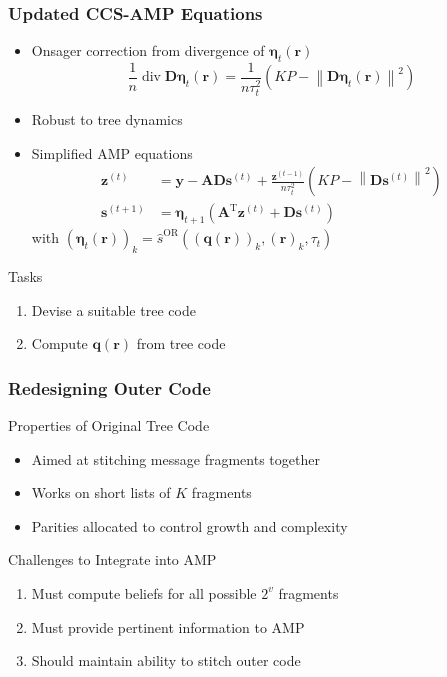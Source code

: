 \documentclass[10pt]{beamer}
\begin{document}
\begin{frame}
\frametitle{Updated CCS-AMP Equations}
\begin{itemize}
\item Onsager correction from divergence of $\boldsymbol{\eta}_t (\mathbf{r})$
\begin{equation*}
\frac{1}{n} \operatorname{div} \mathbf{D} \boldsymbol{\eta}_t \left( \mathbf{r} \right)
= \frac{1}{n \tau_t^2} \left( K P - \left\| \mathbf{D} \boldsymbol{\eta}_t \left( \mathbf{r} \right) \right\|^2 \right)
\end{equation*}
\item Robust to tree dynamics
\item Simplified AMP equations
\begin{align*}
\mathbf{z}^{(t)} &= \mathbf{y} - \mathbf{A} \mathbf{D} \mathbf{s}^{(t)} + \frac{\mathbf{z}^{(t-1)}}{n \tau_t^2} \left( K P - \left\| \mathbf{D} \mathbf{s}^{(t)} \right\|^2 \right) \\
\mathbf{s}^{(t+1)} &= \boldsymbol{\eta}_{t+1} \left( \mathbf{A}^{\mathrm{T}} \mathbf{z}^{(t)} + \mathbf{D} \mathbf{s}^{(t)} \right)
\end{align*}
with $\left( \boldsymbol{\eta}_t \left( \mathbf{r} \right) \right)_k = \hat{s}^{\mathrm{OR}} \left( \left( \mathbf{q} \left( \mathbf{r} \right) \right)_k, \left( \mathbf{r} \right)_k, \tau_t \right)$
\end{itemize}
\begin{exampleblock}{Tasks}
\begin{enumerate}
\item Devise a suitable tree code
\item Compute $\mathbf{q} \left( \mathbf{r} \right)$ from tree code
\end{enumerate}
\end{exampleblock}
\end{frame}


\begin{frame}
\frametitle{Redesigning Outer Code}
\begin{block}{Properties of Original Tree Code}
\begin{itemize}
\item Aimed at stitching message fragments together
\item Works on short lists of $K$ fragments
\item Parities allocated to control growth and complexity
\end{itemize}
\end{block}
\centerline{}
\begin{block}{Challenges to Integrate into AMP}
\begin{enumerate}
\item Must compute beliefs for all possible $2^v$ fragments
\item Must provide pertinent information to AMP
\item Should maintain ability to stitch outer code
\end{enumerate}
\end{block}
\end{frame}
\end{document}
